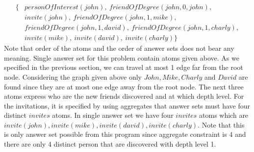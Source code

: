 \documentclass[a4paper, titlepage]{article}
\begin{document}
\begin{align*}
   \{ &\mathit{personOfInterest(john), \ friendOfDegree(john,0,john), }\\
      &\mathit{invite(john), \ friendOfDegree(john,1,mike),}\\ 
      & \mathit{friendOfDegree(john,1,david), \ friendOfDegree(john,1,charly),} \\
      & \mathit{invite(mike), \ invite(david), \ invite(charly)}
       \}
 \end{align*}
Note that order of the atoms and the order of answer sets 
does not bear any meaning. Single answer set for this 
problem contain atoms given above. As we specified in the previous 
section, we can travel at most 1 edge far from the root 
node. Considering the graph given above only $\mathit{John, 
Mike, Charly}$ and $\mathit{David}$ are found since they 
are at most one edge away from the root node. The next three atoms 
express who are the new friends discovered and at which 
depth 
level. For the invitations, it is specified by using 
aggregates that answer sets must have four distinct 
$\mathit{invites}$ atoms.
In single answer set we have four $\mathit{invites}$ atoms 
which are $\mathit{invite(john), 
invite(mike), invite(david), invite(charly)}$. Note that 
this is only answer set possible 
from this program since aggregate constraint is 4 and there 
are only 4 distinct person that are discovered with depth 
level 1. 
\end{document}
